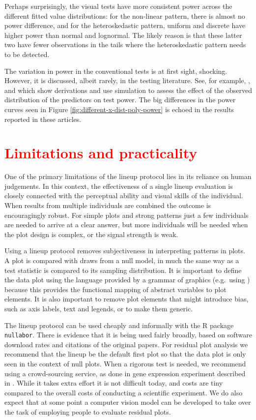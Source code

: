 \documentclass[]{interact}
\theoremstyle{plain}%
\theoremstyle{definition}
\theoremstyle{remark}
\begin{document}
Perhaps surprisingly, the visual tests have more consistent power across
the different fitted value distributions: for the non-linear pattern,
there is almost no power difference, and for the heteroskedastic
pattern, uniform and discrete have higher power than normal and
lognormal. The likely reason is that these latter two have fewer
observations in the tails where the heteroskedastic pattern needs to be
detected.

The variation in power in the conventional tests is at first sight,
shocking. However, it is discussed, albeit rarely, in the testing
literature. See, for example, \citet{jamshidian2007study},
\citet{olvera2019relationship} and \citet{zhang2018practical} which show
derivations and use simulation to assess the effect of the observed
distribution of the predictors on test power. The big differences in the
power curves seen in Figure \ref{fig:different-x-dist-poly-power} is
echoed in the results reported in these articles.

\hypertarget{section}{%
\section{\texorpdfstring{\textcolor{red}{Limitations and practicality}}{}}\label{section}}

One of the primary limitations of the lineup protocol lies in its
reliance on human judgements. In this context, the effectiveness of a
single lineup evaluation is closely connected with the perceptual
ability and visual skills of the individual. When results from multiple
individuals are combined the outcome is encouragingly robust. For simple
plots and strong patterns just a few individuals are needed to arrive at
a clear answer, but more individuals will be needed when the plot design
is complex, or the signal strength is weak.

Using a lineup protocol removes subjectiveness in interpreting patterns
in plots. A plot is compared with draws from a null model, in much the
same way as a test statistic is compared to its sampling distribution.
It is important to define the data plot using the language provided by a
grammar of graphics (e.g.~using \citet{ggplot2}) because this provides
the functional mapping of abstract variables to plot elements. It is
also important to remove plot elements that might introduce bias, such
as axis labels, text and legends, or to make them generic.

The lineup protocol can be used cheaply and informally with the R
package \texttt{nullabor}. There is evidence that it is being used
fairly broadly, based on software download rates and citations of the
original papers. For residual plot analysis we recommend that the lineup
be the default first plot so that the data plot is only seen in the
context of null plots. When a rigorous test is needed, we recommend
using a crowd-sourcing service, as done in gene expression experiment
described in \citet{RNAseq2013}. While it takes extra effort it is not
difficult today, and costs are tiny compared to the overall costs of
conducting a scientific experiment. We do also expect that at some point
a computer vision model can be developed to take over the task of
employing people to evaluate residual plots.
\end{document}
